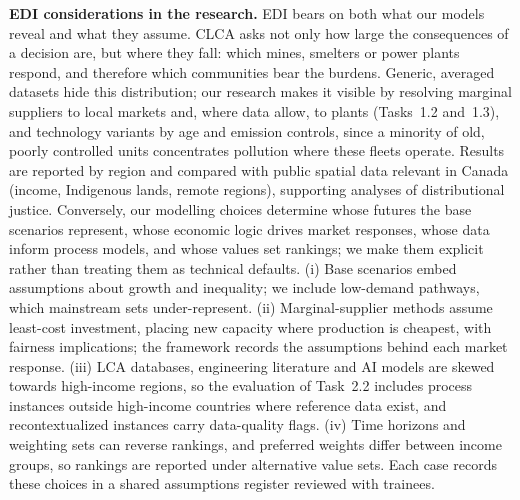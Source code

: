 \documentclass[compact]{nserc} %
\begin{document}
\noindent \textbf{EDI considerations in the research.} EDI bears on both what our models reveal and what they assume. CLCA asks not only how large the consequences of a decision are, but where they fall: which mines, smelters or power plants respond, and therefore which communities bear the burdens. Generic, averaged datasets hide this distribution; our research makes it visible by resolving marginal suppliers to local markets and, where data allow, to plants (Tasks~1.2 and~1.3), and technology variants by age and emission controls, since a minority of old, poorly controlled units concentrates pollution where these fleets operate. Results are reported by region and compared with public spatial data relevant in Canada (income, Indigenous lands, remote regions), supporting analyses of distributional justice. Conversely, our modelling choices determine whose futures the base scenarios represent, whose economic logic drives market responses, whose data inform process models, and whose values set rankings; we make them explicit rather than treating them as technical defaults. (i) Base scenarios embed assumptions about growth and inequality; we include low-demand pathways, which mainstream sets under-represent. (ii) Marginal-supplier methods assume least-cost investment, placing new capacity where production is cheapest, with fairness implications; the framework records the assumptions behind each market response. (iii) LCA databases, engineering literature and AI models are skewed towards high-income regions, so the evaluation of Task~2.2 includes process instances outside high-income countries where reference data exist, and recontextualized instances carry data-quality flags. (iv) Time horizons and weighting sets can reverse rankings, and preferred weights differ between income groups, so rankings are reported under alternative value sets. Each case records these choices in a shared assumptions register reviewed with trainees.
\end{document}
